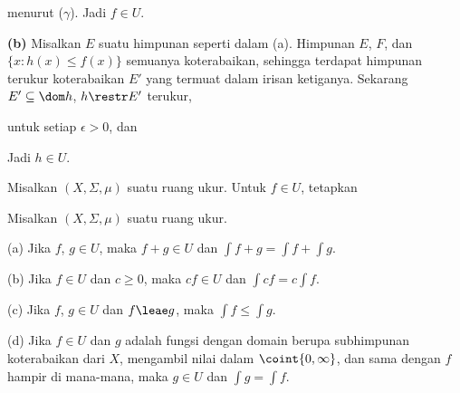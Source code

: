 {

\noindent menurut ($\gamma$). Jadi $f\in U$.

\medskip

{\bf (b)} Misalkan $E$ suatu himpunan seperti dalam (a). Himpunan
$E$, $F$, dan $\{x:h(x)\le f(x)\}$ semuanya koterabaikan, sehingga
terdapat himpunan terukur koterabaikan $E'$ yang termuat dalam irisan
ketiganya. Sekarang $E'\subseteq\dom h$, $h\restr E'$ terukur,


\noindent untuk setiap $\epsilon>0$, dan


\noindent Jadi $h\in U$.
}%

 Misalkan $(X,\Sigma,\mu)$ suatu ruang
ukur. Untuk $f\in U$,
tetapkan





 Misalkan $(X,\Sigma,\mu)$ suatu ruang ukur.

(a) Jika $f$, $g\in U$, maka $f+g\in U$ dan
$\int f+g=\int f+\int g$.

(b) Jika $f\in U$ dan $c\ge 0$, maka $cf\in U$ dan
$\int cf=c\int f$.

(c) Jika $f$, $g\in U$ dan $f\leae g$, maka $\int f\le \int g$.

(d) Jika $f\in U$ dan $g$ adalah fungsi dengan domain berupa
subhimpunan koterabaikan dari $X$, mengambil nilai dalam
$\coint{0,\infty}$, dan sama dengan $f$ hampir di mana-mana, maka
$g\in U$ dan $\int g=\int f$.

